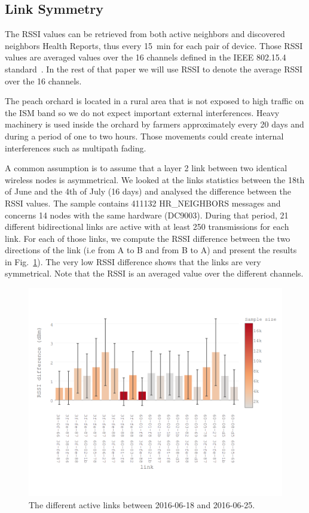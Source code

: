 \documentclass{sig-alternate}
\begin{document}
\subsection{Link Symmetry}
\label{sec:symmetry}


The RSSI values can be retrieved from both active neighbors and discovered neighbors Health Reports, thus every 15~min for each pair of device.
Those RSSI values are averaged values over the 16 channels defined in the IEEE 802.15.4 standard~\cite{std_ieee802154_2011}.
In the rest of that paper we will use RSSI to denote the average RSSI over the 16 channels.


The peach orchard is located in a rural area that is not exposed to high traffic on the ISM band so we do not expect important external interferences.
Heavy machinery is used inside the orchard by farmers approximately every 20 days and during a period of one to two hours.
Those movements could create internal interferences such as multipath fading.


A common assumption is to assume that a layer 2 link between two identical wireless nodes is asymmetrical.
We looked at the links statistics between the 18th of June and the 4th of July (16 days) and analysed the difference between the RSSI values.
The sample contains 411132 HR\_NEIGHBORS messages and concerns 14 nodes with the same hardware (DC9003).
During that period, 21 different bidirectional links are active with at least 250 transmissions for each link.
For each of those links, we compute the RSSI difference between the two directions of the link (i.e from A to B and from B to A) and present the results in Fig.~\ref{fig:tab_symmetry}).
The very low RSSI difference shows that the links are very symmetrical.
Note that the RSSI is an averaged value over the different channels.

\begin{figure}
    \centering
    \includegraphics[width=\columnwidth]{sym_plot}
    \caption{The different active links between 2016-06-18 and 2016-06-25.}
    \label{fig:tab_symmetry}
\end{figure}
\end{document}
